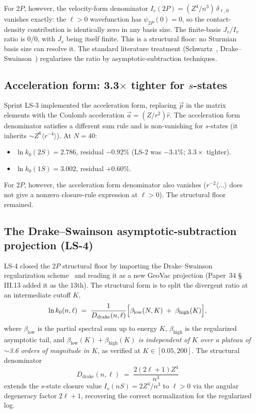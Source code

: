 \documentclass[11pt]{article}
\begin{document}
For 2$P$, however, the velocity-form denominator
$I_v(2P) = (Z^4/n^3)\,\delta_{\ell,0}$ vanishes exactly: the
$\ell > 0$ wavefunction has $\psi_{2P}(0) = 0$, so the contact-density
contribution is identically zero in any basis size.  The
finite-basis $J_v / I_v$ ratio is $0/0$, with $J_v$ being itself
finite.  This is a structural floor: no Sturmian basis size can
resolve it.  The standard literature treatment (Schwartz~\cite{schwartz1961},
Drake--Swainson~\cite{drake_swainson}) regularizes the ratio by
asymptotic-subtraction techniques.

\subsection{Acceleration form: 3.3$\times$ tighter for $s$-states}

Sprint LS-3 implemented the acceleration form, replacing $\vec{p}$
in the matrix elements with the Coulomb acceleration
$\vec{a} = (Z/r^2)\hat{r}$.  The acceleration form denominator
satisfies a different sum rule and is non-vanishing for $s$-states
(it inherits $\sim Z^6 \langle r^{-4}\rangle$).  At $N = 40$:
\begin{itemize}
\setlength\itemsep{0pt}
\item $\ln k_0(2S) = 2.786$, residual $-0.92\%$ (LS-2 was $-3.1\%$;
$3.3\times$ tighter).
\item $\ln k_0(1S) = 3.002$, residual $+0.60\%$.
\end{itemize}
For 2$P$, however, the acceleration form denominator also vanishes
($r^{-2}\langle\ldots\rangle$ does not give a nonzero closure-rule
expression at $\ell > 0$).  The structural floor remained.

\subsection{The Drake--Swainson asymptotic-subtraction projection (LS-4)}

LS-4 closed the 2$P$ structural floor by importing the
Drake--Swainson regularization scheme~\cite{drake_swainson} and
reading it as a new GeoVac projection (Paper~34 \S\,III.13 added it
as the 13th).  The structural form is to split the divergent ratio
at an intermediate cutoff $K$,
\begin{equation}
\label{eq:drake_split}
\ln k_0(n, \ell) \;=\; \frac{1}{D_{\text{drake}}(n, \ell)}
\Bigl[ \beta_{\text{low}}(N, K) \;+\; \beta_{\text{high}}(K) \Bigr],
\end{equation}
where $\beta_{\text{low}}$ is the partial spectral sum up to energy
$K$, $\beta_{\text{high}}$ is the regularized asymptotic tail, and
\emph{$\beta_{\text{low}}(K) + \beta_{\text{high}}(K)$ is independent
of $K$ over a plateau of $\sim$3.6 orders of magnitude in $K$}, as
verified at $K \in [0.05, 200]$.  The structural denominator
\begin{equation}
\label{eq:drake_denom}
D_{\text{drake}}(n, \ell) \;=\; \frac{2(2\ell + 1) Z^4}{n^3}
\end{equation}
extends the $s$-state closure value $I_v(nS) = 2Z^4/n^3$ to
$\ell > 0$ via the angular degeneracy factor $2\ell + 1$, recovering
the correct normalization for the regularized log.
\end{document}
